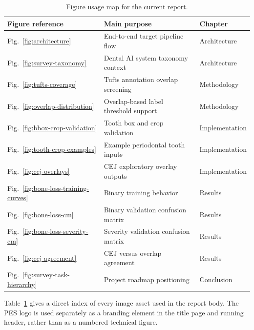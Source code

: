 \begin{table}[htbp]
  \centering
  \caption{Figure usage map for the current report.}
  \label{tab:figure-index}
  \begin{tabular}{@{}lll@{}}
    \toprule
    Figure reference & Main purpose & Chapter \\
    \midrule
    Fig.~\ref{fig:architecture} & End-to-end target pipeline flow & Architecture \\
    Fig.~\ref{fig:survey-taxonomy} & Dental AI system taxonomy context & Architecture \\
    Fig.~\ref{fig:tufts-coverage} & Tufts annotation overlap screening & Methodology \\
    Fig.~\ref{fig:overlap-distribution} & Overlap-based label threshold support & Methodology \\
    Fig.~\ref{fig:bbox-crop-validation} & Tooth box and crop validation & Implementation \\
    Fig.~\ref{fig:tooth-crop-examples} & Example periodontal tooth inputs & Implementation \\
    Fig.~\ref{fig:cej-overlays} & CEJ exploratory overlay outputs & Implementation \\
    Fig.~\ref{fig:bone-loss-training-curves} & Binary training behavior & Results \\
    Fig.~\ref{fig:bone-loss-cm} & Binary validation confusion matrix & Results \\
    Fig.~\ref{fig:bone-loss-severity-cm} & Severity validation confusion matrix & Results \\
    Fig.~\ref{fig:cej-agreement} & CEJ versus overlap agreement & Results \\
    Fig.~\ref{fig:survey-task-hierarchy} & Project roadmap positioning & Conclusion \\
    \bottomrule
  \end{tabular}
\end{table}

Table~\ref{tab:figure-index} gives a direct index of every image asset used in
the report body. The PES logo is used separately as a branding element in the
title page and running header, rather than as a numbered technical figure.
